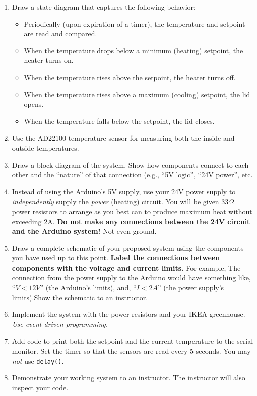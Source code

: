 \documentclass[11pt]{article} %
\begin{document}
\begin{enumerate}
\item Draw a state diagram that captures the following behavior:
\begin{itemize}
\item Periodically (upon expiration of a timer), the temperature and setpoint are read and compared.
\item When the temperature drops below a minimum (heating) setpoint, the heater turns on.
\item When the  temperature rises above the setpoint, the heater turns off.
\item When the temperature rises above a maximum (cooling) setpoint, the lid opens.
\item When the  temperature falls below the setpoint, the lid closes.
\end{itemize}
\item Use the AD22100 temperature sensor for measuring both the inside and outside temperatures.
\item Draw a block diagram of the system. Show how components connect to each other and the “nature” of that connection (e.g., “5V logic”, “24V power”, etc.
\item Instead of using the Arduino's 5V supply, use your 24V power supply to \emph{independently} supply the \emph{power} (heating) circuit. You will be given 33$\Omega$ power resistors to arrange as you best can to produce maximum heat without exceeding 2A. {\bf Do not make any connections between the 24V circuit and the Arduino system!} Not even ground.
\item Draw a complete schematic of your proposed system using the components you have used up to this point. {\bf Label the connections between components with the voltage and current limits.} For example, The connection from the power supply to the Arduino would have something like, ``$V<12V$'' (the Arduino's limits), and, ``$I < 2A$'' (the power supply's limits).Show the schematic to an instructor.
\item Implement the system with the power resistors and your IKEA greenhouse. \emph{Use event-driven programming.}
\item Add code to print both the setpoint and the current temperature to the serial monitor. Set the timer so that the sensors are read every 5 seconds. You may \emph{not} use \verb|delay()|.
\item Demonstrate your working system to an instructor. The instructor will also inspect your code.
\end{enumerate}
\end{document}
